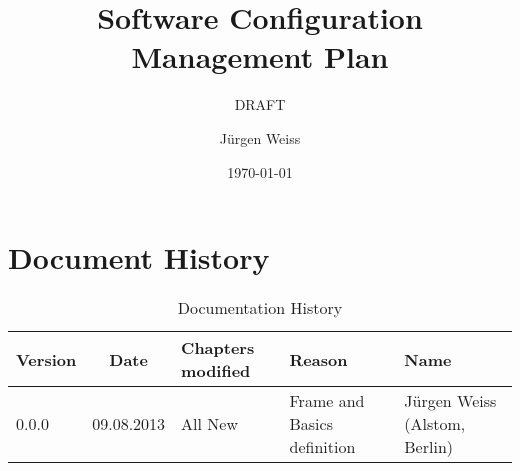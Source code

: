 \documentclass{template/openetcs_article}
\begin{document}
\frontmatter
{}




\title{Software Configuration Management Plan}

\subtitle{DRAFT}

\date{\today}


\author{J\"urgen Weiss}









\maketitle
\tableofcontents
\listoffiguresandtables
\newpage




\linenumbers

\section*{Document History}


\begin{table}[h]
\caption{Documentation History}
\begin{tabular}{|lcp{2cm}ll|} \hline

\rowcolor{grey}
Version & Date & Chapters \mbox{modified} & Reason & Name \\\hline
  0.0.0  & 09.08.2013 & All New & Frame and Basics definition & Jürgen Weiss (Alstom, Berlin) \\\hline

 

\end{tabular}

\end{table}
\newpage
\end{document}
